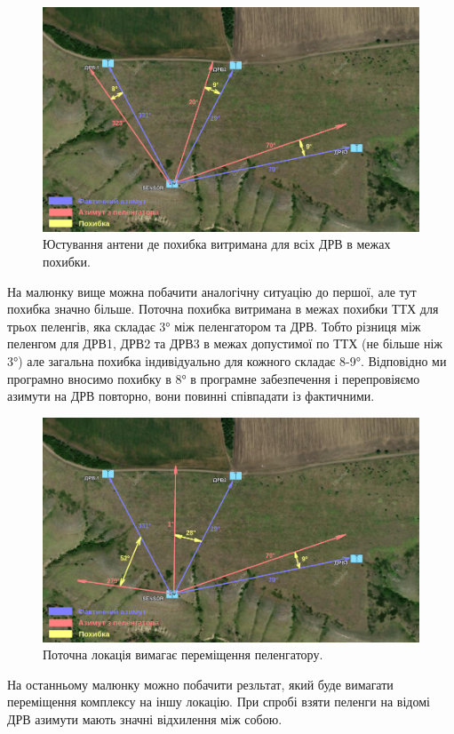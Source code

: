 \documentclass{article}
\begin{document}
\begin{figure}[H]
	\centering
	\includegraphics[width=0.9\linewidth]{images/adjustments_ideal2.png}
	\caption{\label{fig:tsi} Юстування антени де похибка витримана для всіх ДРВ в межах похибки.}
\end{figure}

На малюнку вище можна побачити аналогічну ситуацію до першої, але тут похибка значно більше. Поточна похибка витримана в межах похибки ТТХ для трьох пеленгів, яка складає 3° між пеленгатором та ДРВ. Тобто різниця між пеленгом для ДРВ1, ДРВ2 та ДРВ3 в межах допустимої по ТТХ (не більше ніж 3°) але загальна похибка індивідуально для кожного складає 8-9°. Відповідно ми програмно вносимо похибку в 8° в програмне забезпечення і перепровіяємо азимути на ДРВ повторно, вони повинні співпадати із фактичними.


\begin{figure}[H]
	\centering
	\includegraphics[width=0.9\linewidth]{images/adjustments_not_compatible.png}
	\caption{\label{fig:tsi} Поточна локація вимагає переміщення пеленгатору.}
\end{figure}

На останньому малюнку можно побачити резльтат, який буде вимагати переміщення комплексу на іншу локацію. При спробі взяти пеленги на відомі ДРВ азимути мають значні відхилення між собою.
\end{document}
